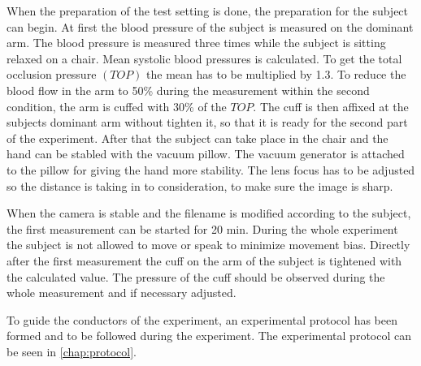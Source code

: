 When the preparation of the test setting is done, the preparation for the subject can begin. At first the blood pressure of the subject is measured on the dominant arm. The blood pressure is measured three times while the subject is sitting relaxed on a chair. Mean systolic blood pressures is calculated. To get the total occlusion pressure $(TOP)$ the mean has to be multiplied by 1.3. To reduce the blood flow in the arm to 50\% during the measurement within the second condition, the arm is cuffed with 30\% of the $TOP$.\cite{mouser2017} 
The cuff is then affixed at the subjects dominant arm without tighten it, so that it is ready for the second part of the experiment. After that the subject can take place in the chair and the hand can be stabled with the vacuum pillow. The vacuum generator is attached to the pillow for giving the hand more stability. The lens focus has to be adjusted so the distance is taking in to consideration, to make sure the image is sharp.

When the camera is stable and the filename is modified according to the subject, the first measurement can be started for 20 min. During the whole experiment the subject is not allowed to move or speak to minimize movement bias.
Directly after the first measurement the cuff on the arm of the subject is tightened with the calculated value. The pressure of the cuff should be observed during the whole measurement and if necessary adjusted.

To guide the conductors of the experiment, an experimental protocol has been formed and to be followed during the experiment. The experimental protocol can be seen in \cref{chap:protocol}. 


